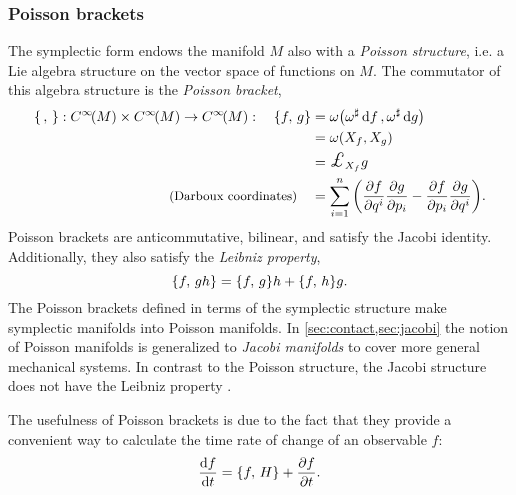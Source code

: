 \subsubsection{Poisson brackets}
The symplectic form endows the manifold \(M\) also with a \emph{Poisson structure}, i.e. a Lie algebra structure on the vector space of functions on \(M\). The commutator of this algebra structure is the \emph{Poisson bracket},
\begin{equation}
    \begin{split}
        \poisson{\,}{}: \functions{M} \times \functions{M} \to \functions{M}: \quad  
        \poisson{f}{g} &= \omega\qty(\fromDual{\omega}\dd{f}, \fromDual{\omega}\dd{g})  \\
                       &= \omega\qty(X_f, X_g) \\
                       &= \lied{X_f}{g} \\
        \text{\small (Darboux coordinates)} \quad &= \sum_{i = 1}^n \qty(\pdv{f}{q^i}\pdv{g}{p_i} - \pdv{f}{p_i}\pdv{g}{q^i}).
    \end{split}
\end{equation}
Poisson brackets are anticommutative, bilinear, and satisfy the Jacobi identity. Additionally, they also satisfy the \emph{Leibniz property}, 
\begin{equation}
     \qty{f,\,gh} = \qty{f,\,g} h + \qty{f,\,h} g.
\end{equation}
The Poisson brackets defined in terms of the symplectic structure make symplectic manifolds into Poisson manifolds. In \cref{sec:contact,sec:jacobi} the notion of Poisson manifolds is generalized to \emph{Jacobi manifolds} to cover more general mechanical systems. In contrast to the Poisson structure, the Jacobi structure does not have the Leibniz property \cite{Arnold1989,Libermann1987}.

The usefulness of Poisson brackets is due to the fact that they provide a convenient way to calculate the time rate of change of an observable \(f\): 
\begin{equation}
     \dv{f}{t} = \qty{f,\,H} + \pdv{f}{t}.
\end{equation}

